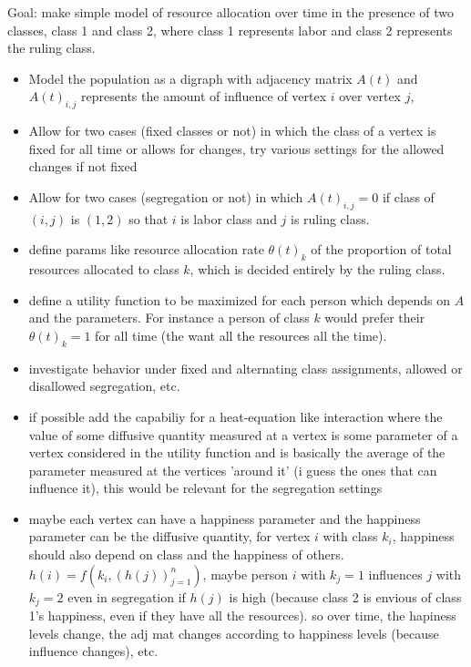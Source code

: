 \documentclass{book}
\begin{document}
	Goal: make simple model of resource allocation over time in the presence of two classes, class 1 and class 2, where class 1 represents labor and class 2 represents the ruling class.
	\begin{itemize}
		\item Model the population as a digraph with adjacency matrix $A(t)$ and $A(t)_{i,j}$ represents the amount of influence of vertex $i$ over vertex $j$, 
		\item Allow for two cases (fixed classes or not) in which the class of a vertex is fixed for all time or allows for changes, try various settings for the allowed changes if not fixed 
		\item Allow for two cases (segregation or not) in which $A(t)_{i,j} = 0$ if class of $(i,j)$ is $(1,2)$ so that $i$ is labor class and $j$ is ruling class.
		\item define params like resource allocation rate $\theta(t)_k$ of the proportion of total resources allocated to class $k$, which is decided entirely by the ruling class. 
		\item define a utility function to be maximized for each person which depends on $A$ and the parameters. For instance a person of class $k$ would prefer their $\theta(t)_k = 1$ for all time (the want all the resources all the time).
		\item investigate behavior under fixed and alternating class assignments, allowed or disallowed segregation, etc. 
		\item if possible add the capabiliy for a heat-equation like interaction where the value of some diffusive quantity measured at a vertex is some parameter of a vertex considered in the utility function and is basically the average of the parameter measured at the vertices 'around it' (i guess the ones that can influence it), this would be relevant for the segregation settings
		\item maybe each vertex can have a happiness parameter and the happiness parameter can be the diffusive quantity, for vertex $i$ with class $k_i$, happiness should also depend on class and the happiness of others. $h(i) = f(k_i, (h(j))_{j = 1}^n)$, maybe person $i$ with $k_j=1$ influences $j$ with $k_j=2$ even in segregation if $h(j)$ is high (because class 2 is envious of class 1's happiness, even if they have all the resources). so over time, the hapiness levels change, the adj mat changes according to happiness levels (because influence changes), etc.     
	\end{itemize}
	
\end{document}
